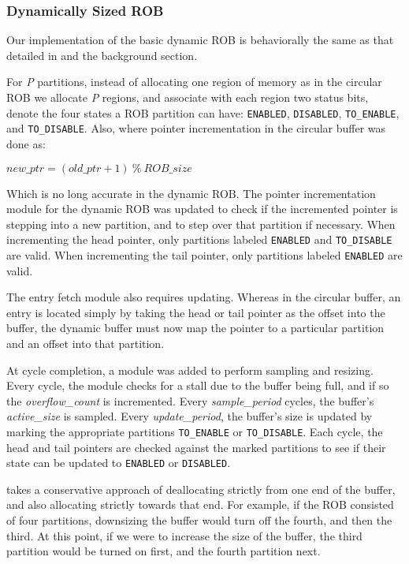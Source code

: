 \subsubsection{Dynamically Sized ROB}
Our implementation of the basic dynamic ROB is behaviorally the same as that detailed in \cite{kucuk2} and the background section.

For {\it P} partitions, instead of allocating one region of memory as in the circular ROB we allocate {\it P} regions, and associate with each region two status bits, denote the four states a ROB partition can have: {\tt ENABLED}, {\tt DISABLED}, {\tt TO\_ENABLE}, and {\tt TO\_DISABLE}. Also, where pointer incrementation in the circular buffer was done as:

\begin{center}
$ new\_ptr = (old\_ptr + 1) \: \% \: ROB\_size $
\end{center}

Which is no long accurate in the dynamic ROB. The pointer incrementation module for the dynamic ROB was updated to check if the incremented pointer is stepping into a new partition, and to step over that partition if necessary. When incrementing the head pointer, only partitions labeled {\tt ENABLED} and {\tt TO\_DISABLE} are valid. When incrementing the tail pointer, only partitions labeled {\tt ENABLED} are valid.

The entry fetch module also requires updating. Whereas in the circular buffer, an entry is located simply by taking the head or tail pointer as the offset into the buffer, the dynamic buffer must now map the pointer to a particular partition and an offset into that partition.

At cycle completion, a module was added to perform sampling and resizing. Every cycle, the module checks for a stall due to the buffer being full, and if so the {\it overflow\_count} is incremented. Every {\it sample\_period} cycles, the buffer's {\it active\_size} is sampled. Every {\it update\_period}, the buffer's size is updated by marking the appropriate partitions {\tt TO\_ENABLE} or {\tt TO\_DISABLE}. Each cycle, the head and tail pointers are checked against the marked partitions to see if their state can be updated to {\tt ENABLED} or {\tt DISABLED}.

\cite{kucuk3} takes a conservative approach of deallocating strictly from one end of the buffer, and also allocating strictly towards that end. For example, if the ROB consisted of four partitions, downsizing the buffer would turn off the fourth, and then the third. At this point, if we were to increase the size of the buffer, the third partition would be turned on first, and the fourth partition next.

